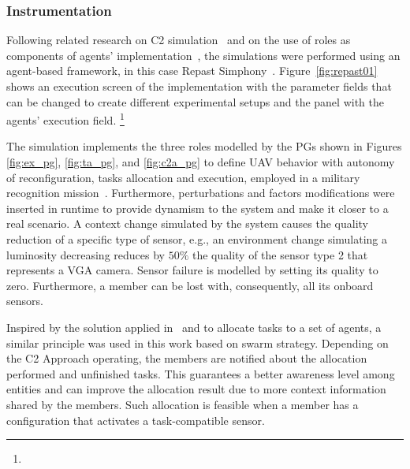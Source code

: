 \subsubsection{Instrumentation}
\label{sssec:instrumentation}

Following related research on C2 simulation~\citep{FRANCE2014, Fernandes2016, Stanton2007, c2-02} and on the use of roles as components of agents' implementation~\citep{agent0010, agent1}, the simulations were performed using an agent-based framework, in this case Repast Simphony~\citep{North2013, SIMUL01, ClaesWohlinPerRuneson2012}. Figure~\ref{fig:repast01} shows an execution screen of the implementation \color{black} with the parameter fields \color{black} that can be changed to create different experimental setups \color{black} and the panel \color{black} with the agents' execution field. \footnote{\executions}

The simulation implements the three roles modelled by the PGs shown in Figures \color{black} \ref{fig:ex_pg}, \ref{fig:ta_pg}, and \ref{fig:c2a_pg}  \color{black} to define UAV behavior with autonomy of reconfiguration, tasks allocation and execution, employed in a military recognition mission~\citep{UAV_Aplication}. Furthermore, perturbations and factors modifications were inserted in runtime to provide dynamism to the system and make it closer to a real scenario. A context change simulated by the system causes the quality reduction of a specific type of sensor, e.g., an environment change simulating a luminosity decreasing \color{black} reduces by $50\%$ \color{black} the quality of the sensor type 2 that represents a VGA camera. Sensor failure is modelled by setting its quality to zero. Furthermore, a member \color{black} can be lost with, consequently, \color{black} all its onboard sensors.

Inspired by the solution applied in~\citet{MAS07} and \citet{UAV01} to allocate tasks to a set of agents, a similar principle was used in this work based on swarm strategy. Depending on the C2 Approach \color{black}operating\color{black}, the members are notified about the allocation performed and unfinished tasks. This guarantees a better awareness level among entities and can improve the allocation result due to more context information shared by the members. Such allocation is feasible when a member has a configuration that activates a \color{black}task-compatible sensor\color{black}.

